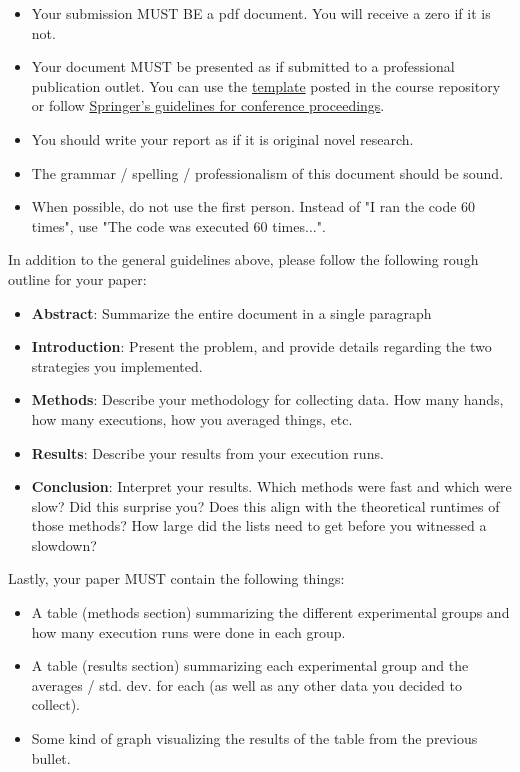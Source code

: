 \documentclass[paper=a4, fontsize=11pt, parskip=full]{scrartcl} %
\numberwithin{equation}{section} %
\numberwithin{figure}{section} %
\numberwithin{table}{section} %
\begin{document}
\begin{itemize}
	\item Your submission MUST BE a pdf document. You will receive a zero if it is not.
	\item Your document MUST be presented as if submitted to a professional publication outlet. You can use the \href{https://github.com/markfloryan/dsa1}{template} posted in the course repository or follow \href{https://www.springer.com/us/computer-science/lncs/conference-proceedings-guidelines}{Springer's guidelines for conference proceedings}.
	\item You should write your report as if it is original novel research.
	\item The grammar / spelling / professionalism of this document should be sound.
	\item When possible, do not use the first person. Instead of "I ran the code 60 times", use "The code was executed 60 times...".
\end{itemize}

In addition to the general guidelines above, please follow the following rough outline for your paper:

\begin{itemize}
	\item \textbf{Abstract}: Summarize the entire document in a single paragraph
	\item \textbf{Introduction}: Present the problem, and provide details regarding the two strategies you implemented.
	\item \textbf{Methods}: Describe your methodology for collecting data. How many hands, how many executions, how you averaged things, etc.
	\item \textbf{Results}: Describe your results from your execution runs.
	\item \textbf{Conclusion}: Interpret your results. Which methods were fast and which were slow? Did this surprise you? Does this align with the theoretical runtimes of those methods? How large did the lists need to get before you witnessed a slowdown?
\end{itemize}

Lastly, your paper MUST contain the following things:

\begin{itemize}
	\item A table (methods section) summarizing the different experimental groups and how many execution runs were done in each group.
	\item A table (results section) summarizing each experimental group and the averages / std. dev. for each (as well as any other data you decided to collect).
	\item Some kind of graph visualizing the results of the table from the previous bullet.
\end{itemize}


\end{document}
